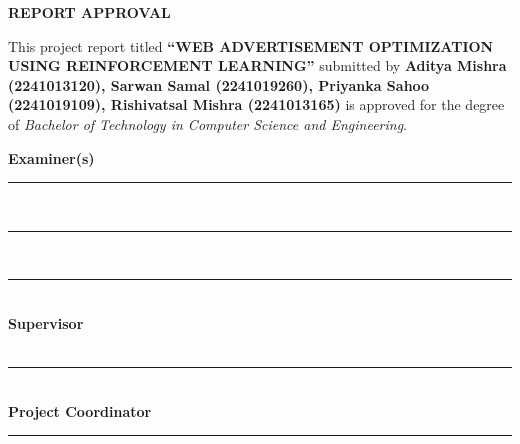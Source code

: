 \begin{center}{\Large\bfseries REPORT APPROVAL}\end{center}
\vspace{1.2em}

This project report titled \textbf{``WEB ADVERTISEMENT OPTIMIZATION USING REINFORCEMENT LEARNING''} submitted by \textbf{Aditya Mishra (2241013120), Sarwan Samal (2241019260), Priyanka Sahoo (2241019109), Rishivatsal Mishra (2241013165)} is approved for the degree of \textit{Bachelor of Technology in Computer Science and Engineering}.

\vspace{2.5em}
\textbf{Examiner(s)}\\[1.5em]
\rule{8cm}{0.4pt}\\[1.5em]
\rule{8cm}{0.4pt}\\[1.5em]
\rule{8cm}{0.4pt}\\

\vspace{2em}
\textbf{Supervisor}\\[1em]
\supervisor\\
\rule{8cm}{0.4pt}\\

\vspace{2em}
\textbf{Project Coordinator}\\[1.5em]
\rule{8cm}{0.4pt}
\newpage
